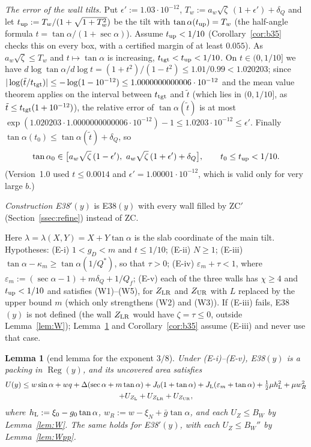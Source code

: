 \documentclass[11pt]{amsart}
\newcommand{\Reg}{\operatorname{Reg}}
\newcommand{\sa}{\sin\alpha}
\newcommand{\ta}{\tan\alpha}
\newcommand{\se}{\sec\alpha}
\newcommand{\taz}{\tan\alpha_0}
\newtheorem{lemma}[theorem]{Lemma}
\theoremstyle{definition}
\theoremstyle{remark}
\numberwithin{equation}{section}
\begin{document}
\emph{The error of the wall tilts.} Put $\epsilon':=1.03\cdot10^{-12}$, $T_w:=a_w\sqrt\zeta\,(1+\epsilon')+\delta_Q$ and let
$t_{\rm up}:=T_w/(1+\sqrt{1+T_w^2})$ be the tilt with $\tan\alpha(t_{\rm up})=T_w$ (the half-angle formula
$t=\ta/(1+\se)$). Assume $t_{\rm up}<1/10$ (Corollary~\ref{cor:b35} checks this on every box, with a certified margin
of at least $0.055$). As $a_w\sqrt\zeta\le T_w$ and $t\mapsto\ta$ is increasing, $t_{\rm tgt}<t_{\rm up}<1/10$. On
$t\in(0,1/10]$ we have $d\log\ta/d\log t=(1+t^2)/(1-t^2)\le1.01/0.99<1.020203$; since
$|\log(\tilde t/t_{\rm tgt})|\le-\log(1-10^{-12})\le1.0000000000006\cdot10^{-12}$ and the mean value theorem applies on
the interval between $t_{\rm tgt}$ and $\tilde t$ (which lies in $(0,1/10]$, as $\tilde t\le t_{\rm tgt}(1+10^{-12})$), the
relative error of $\tan\alpha(\tilde t)$ is at most $\exp(1.020203\cdot1.0000000000006\cdot10^{-12})-1\le1.0203\cdot10^{-12}
\le\epsilon'$. Finally $\tan\alpha(t_0)\le\tan\alpha(\tilde t)+\delta_Q$, so
\[
\taz\in\bigl[a_w\sqrt\zeta\,(1-\epsilon'),\ a_w\sqrt\zeta\,(1+\epsilon')+\delta_Q\bigr],\qquad t_0\le t_{\rm up}<1/10 .
\]
(Version~1.0 used $t\le0.0014$ and $\epsilon'=1.00001\cdot10^{-12}$, which is valid only for very large $b$.)

\emph{Construction E38$'(y)$} is E38$(y)$ with every wall filled by ZC$'$ (Section~\ref{ssec:refine}) instead of ZC.

Here $\lambda=\lambda(X,Y)=X+Y\ta$ is the slab coordinate of the main tilt. Hypotheses:
(E-i) $1<g_D<m$ and $t\le1/10$; (E-ii) $N\ge1$; (E-iii) $\ta-\kappa_m\ge\tan\alpha(1/Q^*)$, so that $\tau>0$;
(E-iv) $\varepsilon_m+\tau<1$, where $\varepsilon_m:=(\se-1)+m\delta_Q+1/Q_f$; (E-v) each of the three walls has
$\chi\ge4$ and $t_{\rm up}<1/10$ and satisfies (W1)--(W5), for $Z_{\rm LR}$ and $Z_{\rm UR}$ with $L$ replaced by the
upper bound $m$ (which only strengthens (W2) and (W3)). If (E-iii) fails, E38$(y)$ is not defined (the wall
$Z_{\rm LR}$ would have $\zeta=\tau\le0$, outside Lemma~\ref{lem:W}); Lemma~\ref{lem:E38} and Corollary~\ref{cor:b35}
assume (E-iii) and never use that case.

\begin{lemma}[end lemma for the exponent $3/8$]\label{lem:E38}
Under (E-i)--(E-v), E38$(y)$ is a packing in $\Reg(y)$, and its uncovered area satisfies
\begin{multline*}
U(y)\le w\sa+wq+\Delta(\se+m\ta)+J_0(1+\ta)+J_{\rm L}(\varepsilon_m+\ta)+\tfrac12\mu h_{\rm L}^2+\mu w_R^2\\
+U_{Z_{\rm L}}+U_{Z_{\rm LR}}+U_{Z_{\rm UR}},
\end{multline*}
where $h_{\rm L}:=\xi_0-g_0\ta$, $w_R:=w-\xi_N+\bar g\ta$, and each $U_Z\le B_W$ by Lemma~\ref{lem:W}.
The same holds for E38$'(y)$, with each $U_Z\le B_W''$ by Lemma~\ref{lem:Wpp}.
\end{lemma}
\end{document}
